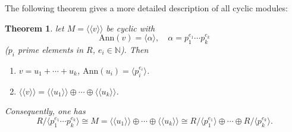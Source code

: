 \documentclass[11pt,openany]{book}
\theoremstyle{plain}
\newtheorem{theorem}{Theorem}[chapter]
\theoremstyle{definition}
\theoremstyle{remark}
\begin{document}
The following theorem gives a more detailed description of all cyclic modules:
\begin{theorem} \label{thm-crt}
    let $M=\langle\langle v\rangle\rangle$ be cyclic with
    $$\mathrm{Ann}(v)=\langle \alpha\rangle,\quad\alpha = p_1^{e_1}\cdots p_k^{e_k}$$
    ($p_i$ prime elements in $R$, $e_i\in\mathbb{N}$). Then
    \begin{enumerate}
        \item $v = u_1+\cdots+u_k$, $\mathrm{Ann}(u_i)=\langle p_i^{e_i}\rangle$.
        \item $\langle\langle v\rangle\rangle = \langle\langle u_1\rangle\rangle\oplus\cdots\oplus\langle\langle u_k\rangle\rangle$.
    \end{enumerate}
    Consequently, one has
    $$R/\langle p_1^{e_1}\cdots p_k^{e_k}\rangle\cong M=\langle\langle u_1\rangle\rangle\oplus\cdots\oplus\langle\langle u_k\rangle\rangle\cong R/\langle p_1^{e_1}\rangle\oplus\cdots\oplus R/\langle p_k^{e_k}\rangle.$$
\end{theorem}
\end{document}
